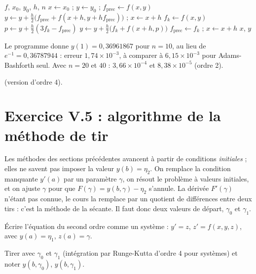 \begin{algo}
  \Require $f$, $x_0$, $y_0$, $h$, $n$
  \State $x \leftarrow x_0$ ; $y \leftarrow y_0$ ; $f_{\text{prec}} \leftarrow f(x, y)$
  \State $y \leftarrow y + \frac h2\bigl(f_{\text{prec}} + f(x + h, y + h f_{\text{prec}})\bigr)$ ; $x \leftarrow x + h$
    \State $f_k \leftarrow f(x, y)$
    \State $p \leftarrow y + \frac h2(3f_k - f_{\text{prec}})$ 
    \State $y \leftarrow y + \frac h2\bigl(f_k + f(x + h, p)\bigr)$ 
    \State $f_{\text{prec}} \leftarrow f_k$ ; $x \leftarrow x + h$
    \Print $x$, $y$
  \EndFor
\end{algo}


\Verif Le programme donne $y(1) = 0{,}36961867$ pour $n = 10$, au lieu de
$e^{-1} = 0{,}36787944$ : erreur $1{,}74\times 10^{-3}$, à comparer à
$6{,}15\times 10^{-3}$ pour Adams-Bashforth seul. Avec $n = 20$ et $40$ :
$3{,}66\times 10^{-4}$ et $8{,}38\times 10^{-5}$ (ordre 2).

\Refs {} (version d'ordre 4).

\section{Exercice V.5 : algorithme de la méthode de tir}


\Pourquoi Les méthodes des sections précédentes avancent à partir de
conditions \emph{initiales} ; elles ne savent pas imposer la valeur
$y(b) = \eta_2$. On remplace la condition manquante $y'(a)$ par un paramètre
$\gamma$, on résout le problème à valeurs initiales, et on ajuste $\gamma$
pour que $F(\gamma) = y(b, \gamma) - \eta_2$ s'annule. La dérivée
$F'(\gamma)$ n'étant pas connue, le cours la remplace par un quotient de
différences entre deux tirs : c'est la méthode de la sécante. Il faut donc
deux valeurs de départ, $\gamma_0$ et $\gamma_1$.

\Etapes
{} Écrire l'équation du second ordre comme un système : $y' = z$,
$z' = f(x, y, z)$, avec $y(a) = \eta_1$, $z(a) = \gamma$.

 Tirer avec $\gamma_0$ et $\gamma_1$ (intégration par Runge-Kutta
d'ordre 4 pour systèmes) et noter $y(b, \gamma_0)$, $y(b, \gamma_1)$.

